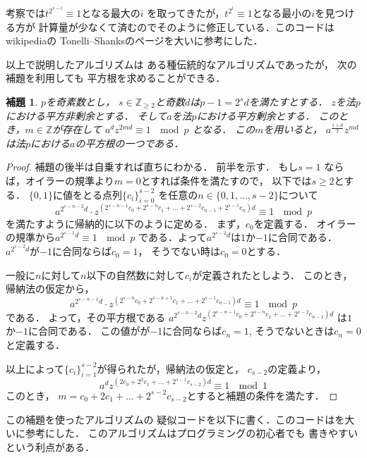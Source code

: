 \documentclass[leqno]{jsarticle}
\newtheorem{lem}[thm]{補題}
\newcommand{\zz}{\mathbb{Z}}
\begin{document}
考察では$t^{2^{s-i}}\equiv 1$となる最大の$i$
を取ってきたが，$t^{2^{i}}\equiv 1$となる最小の$i$を見つける方が
計算量が少なくて済むのでそのように修正している．このコードはwikipediaの
Tonelli--Shanksのページを大いに参考にした．

以上で説明したアルゴリズムは
ある種伝統的なアルゴリズムであったが，
次の補題を利用しても
平方根を求めることができる．
\begin{lem}\label{lem:k}
$p$を奇素数とし，
$s\in \zz_{\ge 2}$と奇数$d$は$p-1=2^{s}d$を満たすとする．
$z$を法$p$における平方非剰余とする．
そして$a$を法$p$における平方剰余とする．
このとき，$m\in \zz$が存在して
$a^{d}z^{2md}\equiv 1\ \mod p$
となる．
この$m$を用いると，
$a^{\frac{1+d}{2}}z^{md}$
は法$p$における$a$の平方根の一つである．
\end{lem}
\begin{proof}
補題の後半は自乗すれば直ちにわかる．
前半を示す．
もし$s=1$
ならば，オイラーの規準より$m=0$とすれば条件を満たすので，
以下では$s\ge 2$とする．
$\{0, 1\}$に値をとる点列$\{c_i\}_{i=0}^{s-2}$
を任意の$n\in \{0, 1, \dots, s-2\}$について
\[
a^{2^{s-n-2}d}\cdot z^{(2^{s-n-1}c_0+2^{s-n}c_1+\dots+ 2^{s-2}c_{n-1}+2^{s-1}c_n)d}
\equiv 
1\ 
\mod p
\]
を満たすように帰納的に以下のように定める．
まず，$c_0$を定義する．
オイラーの規準から$a^{2^{s-1}d}\equiv 1\ \mod p$
である．よって$a^{2^{s-2}d}$は$1$か$-1$に合同である．
$a^{2^{s-2}d}$が$-1$に合同ならば$c_0=1$，
そうでない時は$c_0=0$とする．

一般に$n$に対して$n$以下の自然数に対して$c_{i}$が定義されたとしよう．
このとき，帰納法の仮定から，
\[
a^{2^{s-n-1}d}\cdot z^{(2^{s-n}c_0+2^{s-n+1}c_1+\dots+ 2^{s-1}c_{n-1})d}
\equiv 
1\ 
\mod p
\]
である．
よって，その平方根である
$a^{2^{s-n-2}d}z^{(2^{s-n-1}c_0+2^{s-n}c_1+\dots+ 2^{s-2}c_{n-1})d}$
は$1$か$-1$に合同である．
この値がが$-1$に合同ならば$c_n=1$, 
そうでないときは$c_n=0$と定義する．

以上によって$\{c_i\}_{i=1}^{s-2}$が得られたが，帰納法の仮定と，
$c_{s-2}$の定義より，
\[
a^{d}z^{(2c_0+2^{2}c_1+\dots+ 2^{s-1}c_{s-2})d}\equiv 1\ \mod 1
\]
このとき，
$m=c_0+2c_1+\dots+2^{s-2}c_{s-2}$とすると補題の条件を満たす．
\end{proof}


この補題を使ったアルゴリズムの
疑似コードを以下に書く．このコードは\cite{2}を大いに参考にした．
このアルゴリズムはプログラミングの初心者でも
書きやすいという利点がある．
\end{document}
